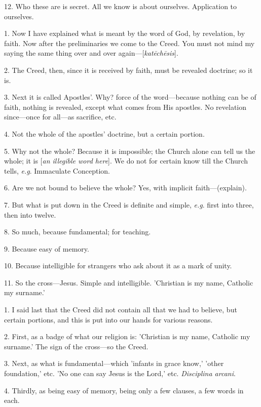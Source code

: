 12. Who these are is secret. All we know is about
ourselves. Application to ourselves.


1. Now I have explained what is meant by the word
of God, by revelation, by faith. Now after the preliminaries we come
to the Creed. You must not mind my saying the same thing over and over
again—[\emph{kat\={e}ch\={e}sis}].

2. The Creed, then, since it is received by
faith, must be revealed doctrine; so it is.

3. Next it is called Apostles'. Why? force of the
word—because nothing can be of faith, nothing is revealed, except
what comes from His apostles. No revelation since—once for all—as
sacrifice, etc.

4. Not the whole of the apostles' doctrine, but a
certain portion.

5. Why not the whole? Because it is impossible;
the Church alone can tell us the whole; it is [\emph{an illegible word
here}]. We do not for certain know till the Church tells, \emph{e.g}.
Immaculate Conception.

6. Are we not bound to believe the whole? Yes,
with implicit faith—(explain).

7. But what is put down in the Creed is definite
and simple, \emph{e.g}. first into three, then into twelve.

8. So much, because fundamental; for teaching.

9. Because easy of memory.

10. Because intelligible for strangers who ask
about it as a mark of unity.

11. So the cross—Jesus. Simple and
intelligible. 'Christian is my name, Catholic my surname.'


1. I said last that the Creed did not contain all
that we had to believe, but certain portions, and this is put into our
hands for various reasons.

2. First, as a badge of what our religion is:
'Christian is my name, Catholic my surname.' The sign of the
cross—so the Creed.

3. Next, as what is fundamental—which 'infants
in grace know,' 'other foundation,' etc. 'No one can say Jesus is the
Lord,' etc. \emph{Disciplina arcani}.

4. Thirdly, as being easy of memory, being only a
few clauses, a few words in each.

